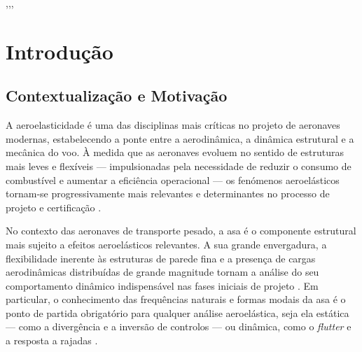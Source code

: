 \documentclass[a4paper,fleqn,noprintline]{cas-dc}
\begin{document}

\begin{abstract}
Here goes the abstract \nocite{*}%
\end{abstract}


\begin{highlights}
\item 
\item 
\item 
\end{highlights}



\begin{keywords}
 \sep \sep \sep
\end{keywords}

\maketitle

\section{Introdução}
\label{chap:introducao}

\subsection{Contextualização e Motivação}

A aeroelasticidade é uma das disciplinas mais críticas no projeto de aeronaves modernas, estabelecendo a ponte entre a aerodinâmica, a dinâmica estrutural e a mecânica do voo. À medida que as aeronaves evoluem no sentido de estruturas mais leves e flexíveis --- impulsionadas pela necessidade de reduzir o consumo de combustível e aumentar a eficiência operacional --- os fenómenos aeroelásticos tornam-se progressivamente mais relevantes e determinantes no processo de projeto e certificação \cite{Wright2015, Dowell2004}.

No contexto das aeronaves de transporte pesado, a asa é o componente estrutural mais sujeito a efeitos aeroelásticos relevantes. A sua grande envergadura, a flexibilidade inerente às estruturas de parede fina e a presença de cargas aerodinâmicas distribuídas de grande magnitude tornam a análise do seu comportamento dinâmico indispensável nas fases iniciais de projeto \cite{Megson2012, Bisplinghoff1996}. Em particular, o conhecimento das frequências naturais e formas modais da asa é o ponto de partida obrigatório para qualquer análise aeroelástica, seja ela estática --- como a divergência e a inversão de controlos --- ou dinâmica, como o \textit{flutter} e a resposta a rajadas \cite{Collar1946, Fung1993}.
\end{document}
